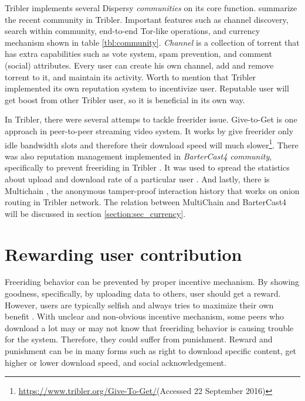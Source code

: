 Tribler implements several Dispersy \textit{communities} on its core function. \citeauthor{2016:tribler-techdebt:vos} summarize the recent community in Tribler. Important features such as channel discovery, search within community, end-to-end Tor-like operations, and currency mechanism shown in table \ref{tbl:community}. \textit{Channel} is a collection of torrent that has extra capabilities such as vote system, spam prevention, and comment (social) attributes. Every user can create his own channel, add and remove torrent to it, and maintain its activity. Worth to mention that Tribler implemented its own reputation system to incentivize user. Reputable user will get boost from other Tribler user, so it is beneficial in its own way.

In Tribler, there were several attemps to tackle freerider issue. Give-to-Get \cite{2008:givetogetvod:Mol} is one approach in peer-to-peer streaming video system. It works by give freerider only idle bandwidth slots and therefore their download speed will much slower\footnote{\url{https://www.tribler.org/Give-To-Get/}(Accessed 22 September 2016)}. There was also reputation management implemented in \textit{BarterCast4 community}, specifically to prevent freeriding in Tribler \cite{2009:bartercast:meulpolder}. It was used to spread the statistics about upload and download rate of a particular user \cite{2016:tribler-techdebt:vos}. And lastly, there is Multichain \cite{2015:multichain:norberhuis}, the anonymous tamper-proof interaction history that works on onion routing in Tribler network. The relation between MultiChain and BarterCast4 will be discussed in section \ref{section:sec_currency}.

\section{Rewarding user contribution}
\label{sec:userreward}
Freeriding behavior can be prevented by proper incentive mechanism. By showing goodness, specifically, by uploading data to others, user should get a reward. However, users are typically selfish and always tries to maximize their own benefit \cite{2015:incentivep2pgame:kang}. With unclear and non-obvious incentive mechanism, some peers who download a lot may or may not know that freeriding behavior is causing trouble for the system. Therefore, they could suffer from punishment. Reward and punishment can be in many forms such as right to download specific content, get higher or lower download speed, and social acknowledgement.

